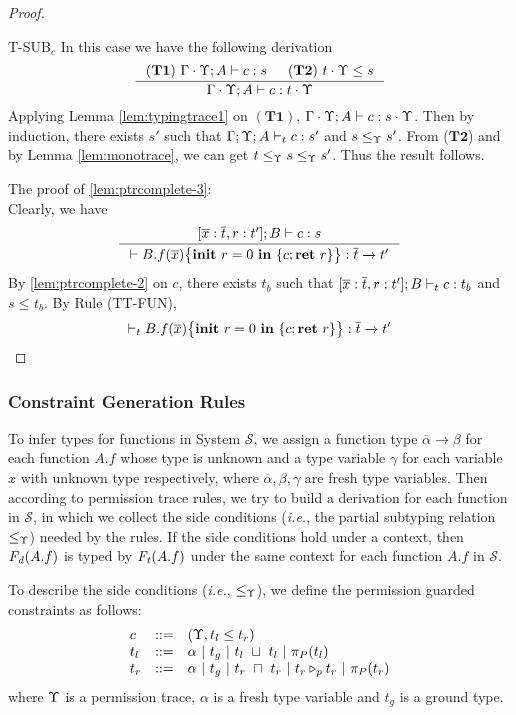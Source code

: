 {{{\begin{proof}
\begin{ProofEnumDesc}
\item[T-SUB$_c$] In this case we have the following derivation
\begin{equation*}
\inference
{(\mathbf{T1})~\Gamma\cdot\trace; A\vdash c : s & (\mathbf{T2})~ t\cdot\trace \leq s}
{\Gamma\cdot\trace; A\vdash c : t\cdot \trace}
\end{equation*}
Applying Lemma \ref{lem:typingtrace1} on $(\mathbf{T1})$, $\Gamma\cdot\trace; A\vdash c : s\cdot\trace$.
Then by induction, there exists $s'$ such that $\Gamma;\trace; A\vdash_{t} c : s'$ and $s \leq_{\trace} s' $.
From ($\mathbf{T2}$) and by Lemma \ref{lem:monotrace}, we can get $t\leq_{\trace} s\leq_{\trace} s'$.  Thus the result follows.

\end{ProofEnumDesc}
The proof of \ref{lem:ptrcomplete-3}: \\
Clearly, we have
\begin{equation*}
\inference
{
[\overline{x}: \overline{t}, \lpRES: t']; B \vdash c : s
}
{\vdash \lpPROG{B.f}{\overline{x}}{c}{\lpRES} :  \overline{t}\xrightarrow{} t'}
\end{equation*}
By \ref{lem:ptrcomplete-2} on $c$, there exists $t_b$ such that $[\overline{x}: \overline{t}, \lpRES: t']; B \vdash_{t} c : t_b$ and $s \leq_{} t_b $.
By Rule {(TT-FUN)},
$$\vdash_{t} \lpPROG{B.f}{\overline{x}}{c}{\lpRES} :  \overline{t}\xrightarrow{} t'$$
\end{proof}



\subsubsection{\textbf{Constraint Generation Rules}}
To infer types for functions in System $\mathcal{S}$, we assign a function type $\overline{\alpha}\!\rightarrow\!\beta$ for each function $A.f$ whose type is unknown and a type variable $\gamma$ for each  variable $x$ with unknown type respectively, where $\overline{\alpha},\beta,\gamma$ are fresh type variables.
Then according to permission trace rules, we try to build a derivation for each function in $\mathcal{S}$, in which we collect the side conditions (\emph{i.e.}, the partial subtyping relation $\leq_{\trace}$) needed by the rules.
If the side conditions hold under a context, then $\FD(A.f)$ is typed by $\FT(A.f)$ under the same context for each function $A.f$ in $\mathcal{S}$.

To describe the side conditions (\emph{i.e.},  $\leq_{\trace}$), we define the permission guarded constraints as follows:
\begin{equation*}
\begin{array}{lll}
c &::=& (\trace, t_l \leq t_r)\\
t_l &::=& \alpha~|~t_{g} ~ |~ t_l~\sqcup~t_l ~|~\app{t_l}{P}\\
t_r &::=&\alpha~|~t_{g} ~|~t_r~\sqcap~t_r ~|~\omerge{p}{t_r}{t_r}~|~\app{t_r}{P}\\
\end{array}
\end{equation*}
where $\trace$ is a permission trace, $\alpha$ is a fresh type variable and $t_{g}$ is a ground type.

}}}
